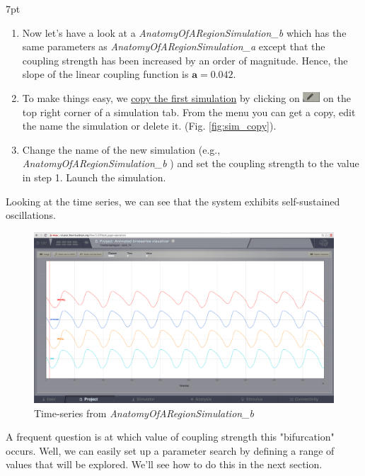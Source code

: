 \documentclass{tufte-handout}
\newenvironment{simulation}{%
  \def\FrameCommand{%
    \hspace{1pt}%
    {\color{ForestGreen}\vrule width 2pt}%
    {\color{simulationshade}\vrule width 4pt}%
    \colorbox{simulationshade}%
  }%
  \MakeFramed{\advance\hsize-\width\FrameRestore}%
  \noindent\hspace{-4.55pt}%
  \begin{adjustwidth}{}{7pt}%
  \vspace{2pt}\vspace{2pt}%
}
{%
  \vspace{2pt}\end{adjustwidth}\endMakeFramed%
}
\begin{document}
\begin{simulation}
\begin{enumerate}
\item Now let's have a look at a \textit{AnatomyOfARegionSimulation\_b} which has the same parameters as \textit{AnatomyOfARegionSimulation\_a} except that
the coupling strength has been increased by an order of magnitude. Hence, the slope of the linear coupling function is  $\mathbf{a=0.042}$.
\item To make things easy, we \underline{copy the first simulation}  by clicking on \includegraphics[width=0.05\textwidth]{butt_pencil.png} on the top right corner of a simulation tab. 
From the menu you can get a copy, edit the name the simulation or delete it. (Fig. \ref{fig:sim_copy}).
\item Change the name of the new simulation (e.g., \textit{AnatomyOfARegionSimulation\_b} ) and set the coupling strength to the value in step 1. Launch the simulation.
\end{enumerate}
\end{simulation}


Looking at the time series, we can see that the system exhibits self-sustained
oscillations. 

\begin{figure}[h]
  \includegraphics[width=\linewidth]{Handout_UI_BuildingYourOwnBrainNetworkModel_AnimatedTimeSeriesOscillatory}%
  \caption{Time-series from \textit{AnatomyOfARegionSimulation\_b}}%
  \label{fig:time_series_oscillatory}%
\end{figure}


A frequent question is at which value of coupling strength this
"bifurcation" occurs. Well, we can easily set up a parameter search by defining a
range of values that will be explored. We'll see how to do this in the next section.
\end{document}
